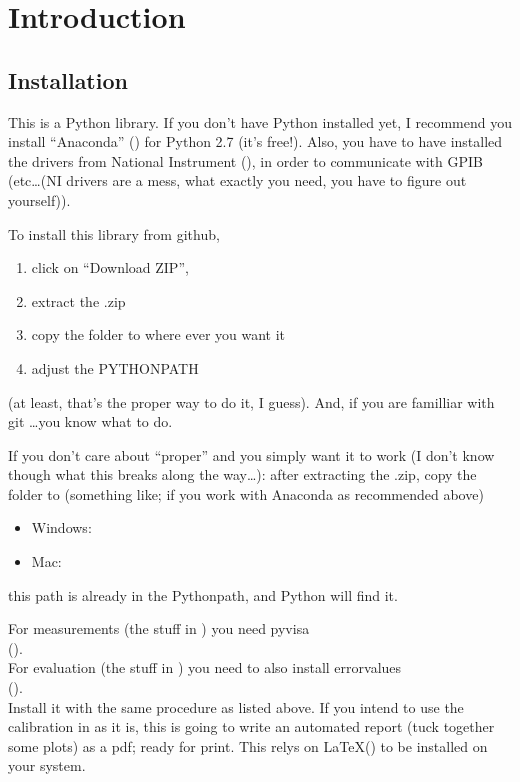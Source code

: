 \section{Introduction}

\subsection{Installation}

This is a Python library.
If you don't have Python installed yet,
I recommend you install ``Anaconda'' ()
for Python 2.7 (it's free!).
Also,
you have to have installed
the drivers from National Instrument (),
in order to communicate with GPIB
(etc\ldots (NI drivers are a mess, what exactly you need, you have to figure out yourself)).

To install this library
from github,
\begin{enumerate}
  \item click on ``Download ZIP'',
  \item extract the .zip
  \item copy the folder to where ever you want it
  \item adjust the PYTHONPATH
\end{enumerate}
(at least, that's the proper way to do it, I guess).  
And, if you are familliar with git \ldots you know what to do.

If you don't care about ``proper''
and you simply want it to work
(I don't know though what this breaks along the way\ldots):  
after extracting the .zip,
copy the folder to (something like; if you work with Anaconda as recommended above)
\begin{itemize}
  \item Windows: 
  \item Mac: 
\end{itemize}
this path is already in the Pythonpath,
and Python will find it.

For measurements (the stuff in ) you need pyvisa \\
().\\
For evaluation (the stuff in ) you need to also install errorvalues \\
(). \\
Install it with the same procedure as listed above.
If you intend to use the calibration in  as it is,
this is going to write an automated report (tuck together some plots) as a pdf;
ready for print.
This relys on \LaTeX () to be installed on your system.

